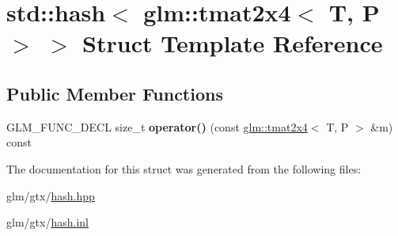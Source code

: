 \hypertarget{structstd_1_1hash_3_01glm_1_1tmat2x4_3_01T_00_01P_01_4_01_4}{\section{std\-:\-:hash$<$ glm\-:\-:tmat2x4$<$ T, P $>$ $>$ Struct Template Reference}
\label{structstd_1_1hash_3_01glm_1_1tmat2x4_3_01T_00_01P_01_4_01_4}
}
\subsection*{Public Member Functions}
\begin{DoxyCompactItemize}
\item 
\hypertarget{structstd_1_1hash_3_01glm_1_1tmat2x4_3_01T_00_01P_01_4_01_4_a48fd08457e953c2c56b8805d7926c8de}{G\-L\-M\-\_\-\-F\-U\-N\-C\-\_\-\-D\-E\-C\-L size\-\_\-t {\bfseries operator()} (const \hyperlink{structglm_1_1tmat2x4}{glm\-::tmat2x4}$<$ T, P $>$ \&m) const }\label{structstd_1_1hash_3_01glm_1_1tmat2x4_3_01T_00_01P_01_4_01_4_a48fd08457e953c2c56b8805d7926c8de}

\end{DoxyCompactItemize}


The documentation for this struct was generated from the following files\-:\begin{DoxyCompactItemize}
\item 
glm/gtx/\hyperlink{hash_8hpp}{hash.\-hpp}\item 
glm/gtx/\hyperlink{hash_8inl}{hash.\-inl}\end{DoxyCompactItemize}
